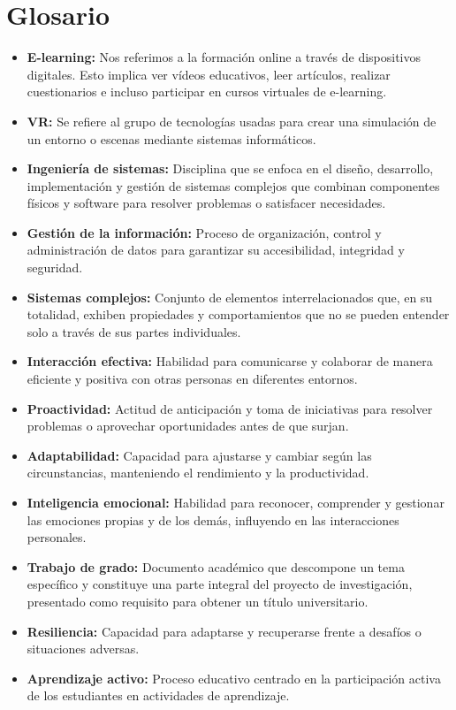 \section{Glosario}
\begin{itemize}
    
    \item \textbf{E-learning:} Nos referimos a la formación online a través de dispositivos digitales. Esto implica ver vídeos educativos, leer artículos, realizar cuestionarios e incluso participar en cursos virtuales de e-learning.\cite{l}

    \item \textbf{VR:} Se refiere al grupo de tecnologías usadas para crear una simulación de un entorno o escenas mediante sistemas informáticos.

    \item \textbf{Ingeniería de sistemas:} Disciplina que se enfoca en el diseño, desarrollo, implementación y gestión de sistemas complejos que combinan componentes físicos y software para resolver problemas o satisfacer necesidades.
\item \textbf{Gestión de la información:} Proceso de organización, control y administración de datos para garantizar su accesibilidad, integridad y seguridad.
\item \textbf{Sistemas complejos:} Conjunto de elementos interrelacionados que, en su totalidad, exhiben propiedades y comportamientos que no se pueden entender solo a través de sus partes individuales.
\item \textbf{Interacción efectiva:} Habilidad para comunicarse y colaborar de manera eficiente y positiva con otras personas en diferentes entornos.
\item \textbf{Proactividad:} Actitud de anticipación y toma de iniciativas para resolver problemas o aprovechar oportunidades antes de que surjan.
\item \textbf{Adaptabilidad:} Capacidad para ajustarse y cambiar según las circunstancias, manteniendo el rendimiento y la productividad.
\item \textbf{Inteligencia emocional:} Habilidad para reconocer, comprender y gestionar las emociones propias y de los demás, influyendo en las interacciones personales.
\item \textbf{Trabajo de grado:} Documento académico que descompone un tema específico y constituye una parte integral del proyecto de investigación, presentado como requisito para obtener un título universitario.
\item \textbf{Resiliencia:} Capacidad para adaptarse y recuperarse frente a desafíos o situaciones adversas.
\item \textbf{Aprendizaje activo:} Proceso educativo centrado en la participación activa de los estudiantes en actividades de aprendizaje.


\end{itemize}



